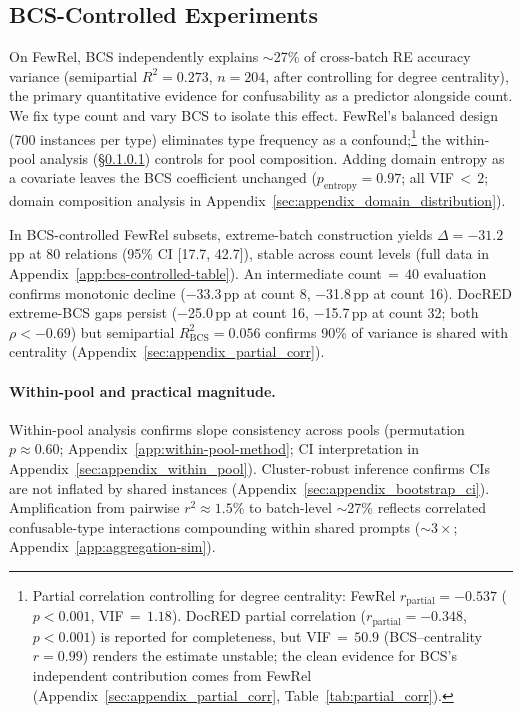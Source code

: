\subsection{BCS-Controlled Experiments}
\label{sec:bcs_controlled}

On FewRel, BCS independently explains ${\sim}$27\% of cross-batch RE accuracy variance (semipartial $R^2 = 0.273$, $n = 204$, after controlling for degree centrality), the primary quantitative evidence for confusability as a predictor alongside count. We fix type count and vary BCS to isolate this effect. FewRel's balanced design (700 instances per type) eliminates type frequency as a confound;\footnote{Partial correlation controlling for degree centrality: FewRel $r_{\text{partial}} = -0.537$ ($p < 0.001$, VIF${}\,=\,1.18$). DocRED partial correlation ($r_{\text{partial}} = -0.348$, $p < 0.001$) is reported for completeness, but VIF${}\,=\,50.9$ (BCS--centrality $r = 0.99$) renders the estimate unstable; the clean evidence for BCS's independent contribution comes from FewRel (Appendix~\ref{sec:appendix_partial_corr}, Table~\ref{tab:partial_corr}).} the within-pool analysis (\S\ref{sec:within_pool}) controls for pool composition. Adding domain entropy as a covariate leaves the BCS coefficient unchanged ($p_{\text{entropy}} = 0.97$; all VIF${}\,<\,2$; domain composition analysis in Appendix~\ref{sec:appendix_domain_distribution}).

In BCS-controlled FewRel subsets, extreme-batch construction yields $\Delta = -31.2$\,pp at 80 relations (95\% CI [17.7, 42.7]), stable across count levels (full data in Appendix~\ref{app:bcs-controlled-table}). An intermediate count${}\,=\,40$ evaluation confirms monotonic decline ($-$33.3\,pp at count 8, $-$31.8\,pp at count 16). DocRED extreme-BCS gaps persist ($-$25.0\,pp at count 16, $-$15.7\,pp at count 32; both $\rho < -0.69$) but semipartial $R^2_{\text{BCS}} = 0.056$ confirms 90\% of variance is shared with centrality (Appendix~\ref{sec:appendix_partial_corr}).

\paragraph{Within-pool and practical magnitude.}
\label{sec:within_pool}
\label{sec:practical_magnitude}
Within-pool analysis confirms slope consistency across pools (permutation $p \approx 0.60$; Appendix~\ref{app:within-pool-method}; CI interpretation in Appendix~\ref{sec:appendix_within_pool}). Cluster-robust inference confirms CIs are not inflated by shared instances (Appendix~\ref{sec:appendix_bootstrap_ci}). Amplification from pairwise $r^2 \approx 1.5\%$ to batch-level ${\sim}$27\% reflects correlated confusable-type interactions compounding within shared prompts \citep{robinson-1950-ecological,baan-2023-ecological} (${\sim}3\times$; Appendix~\ref{app:aggregation-sim}).

